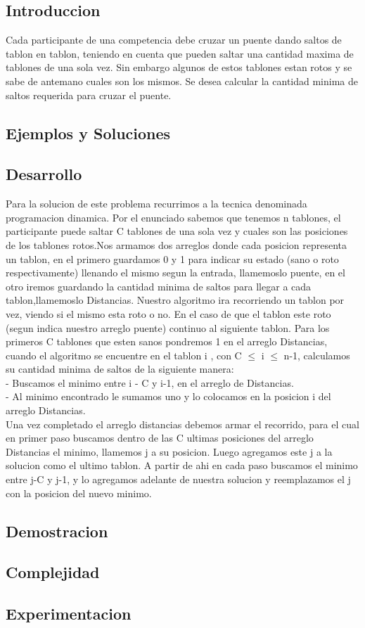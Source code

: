 \subsection{Introduccion} 
Cada participante de una competencia debe cruzar un puente dando saltos de tablon en tablon, teniendo en cuenta que pueden saltar una cantidad maxima de tablones de una sola vez. Sin embargo algunos de estos tablones estan rotos y se sabe de antemano cuales son los mismos. 
Se desea calcular la cantidad minima de saltos requerida para cruzar el puente.

\subsection{Ejemplos y Soluciones}


\subsection{Desarrollo}
Para la solucion de este problema recurrimos a la tecnica denominada programacion dinamica. 
Por el enunciado sabemos que tenemos n tablones, el participante puede saltar C tablones de una sola vez y cuales son las posiciones de los tablones rotos.Nos armamos dos arreglos donde cada posicion representa un tablon, en el primero guardamos 0 y 1 para indicar su estado (sano o roto respectivamente) llenando el mismo segun la entrada, llamemoslo puente, en el otro iremos guardando la cantidad minima de saltos para llegar a cada tablon,llamemoslo Distancias.
Nuestro algoritmo ira recorriendo un tablon por vez, viendo si el mismo esta roto o no. En el caso de que el tablon este roto (segun indica nuestro arreglo puente) continuo al siguiente tablon.
Para los primeros C tablones que esten sanos pondremos 1 en el arreglo Distancias, cuando el algoritmo se encuentre en el tablon i , con C $\leq$ i $\leq $ n-1, calculamos su cantidad minima de saltos de la siguiente manera:\\
- Buscamos el minimo entre i - C y i-1, en el arreglo de Distancias.\\
- Al minimo encontrado le sumamos uno y lo colocamos en la posicion i del arreglo Distancias.\\
Una vez completado el arreglo distancias debemos armar el recorrido, para el cual en primer paso buscamos dentro de las C ultimas posiciones del arreglo Distancias el minimo, llamemos j a su posicion. Luego agregamos este j a la solucion como el ultimo tablon.
A partir de ahi en cada paso buscamos el minimo entre j-C y j-1, y lo agregamos adelante de nuestra solucion y reemplazamos el j con la posicion del nuevo minimo.
\subsection{Demostracion}



\subsection{Complejidad}

\subsection{Experimentacion}

  

 
